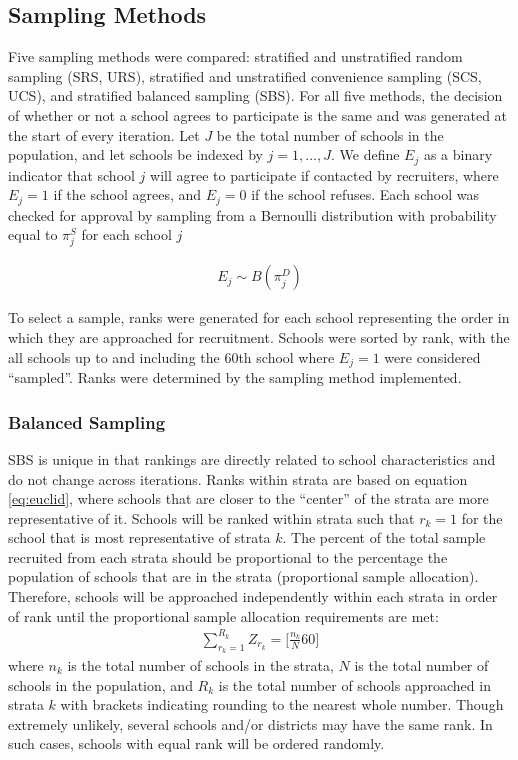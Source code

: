 \documentclass[man,floatsintext]{apa6}
\begin{document}
\hypertarget{sampling-methods}{%
\subsection{Sampling Methods}\label{sampling-methods}}

Five sampling methods were compared: stratified and unstratified random sampling (SRS, URS), stratified and unstratified convenience sampling (SCS, UCS), and stratified balanced sampling (SBS). For all five methods, the decision of whether or not a school agrees to participate is the same and was generated at the start of every iteration. Let \(J\) be the total number of schools in the population, and let schools be indexed by \(j = 1, ..., J\). We define \(E_j\) as a binary indicator that school \(j\) will agree to participate if contacted by recruiters, where \(E_j = 1\) if the school agrees, and \(E_j = 0\) if the school refuses. Each school was checked for approval by sampling from a Bernoulli distribution with probability equal to \(\pi^S_j\) for each school \(j\)

\begin{align} \label{eq:Ej}
  E_j \sim B(\pi^D_j)
\end{align}

To select a sample, ranks were generated for each school representing the order in which they are approached for recruitment. Schools were sorted by rank, with the all schools up to and including the 60th school where \(E_j = 1\) were considered \enquote{sampled}. Ranks were determined by the sampling method implemented.

\hypertarget{balanced-sampling}{%
\subsubsection{Balanced Sampling}\label{balanced-sampling}}

SBS is unique in that rankings are directly related to school characteristics and do not change across iterations. Ranks within strata are based on equation \eqref{eq:euclid}, where schools that are closer to the \enquote{center} of the strata are more representative of it. Schools will be ranked within strata such that \(r_k= 1\) for the school that is most representative of strata \(k\). The percent of the total sample recruited from each strata should be proportional to the percentage the population of schools that are in the strata (proportional sample allocation). Therefore, schools will be approached independently within each strata in order of rank until the proportional sample allocation requirements are met:
\begin{align} \label{eq:rankCASS}
  \sum_{r_{k}=1}^{R_k}{Z_{r_k} = [\frac{n_k}{N}60}]
\end{align}
where \(n_k\) is the total number of schools in the strata, \(N\) is the total number of schools in the population, and \(R_k\) is the total number of schools approached in strata \(k\) with brackets indicating rounding to the nearest whole number. Though extremely unlikely, several schools and/or districts may have the same rank. In such cases, schools with equal rank will be ordered randomly.
\end{document}
